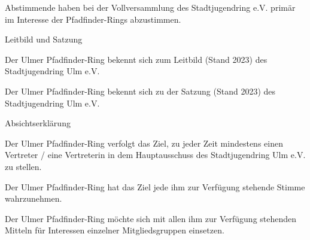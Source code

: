 \begin{legal}
\begin{legal}
\begin{legal}
                    \item Abstimmende haben bei der Vollversammlung des Stadtjugendring e.V. primär 
                          im Interesse der Pfadfinder-Rings abzustimmen.
                \end{legal}
            \item Leitbild und Satzung
                \begin{legal}
                    \item Der Ulmer Pfadfinder-Ring bekennt sich zum Leitbild (Stand 2023) des 
                          Stadtjugendring Ulm e.V.
                    \item Der Ulmer Pfadfinder-Ring bekennt sich zu der Satzung (Stand 2023) des 
                          Stadtjugendring Ulm e.V.
                \end{legal}
        \end{legal}
    \item Absichtserklärung
        \begin{legal}
            \item Der Ulmer Pfadfinder-Ring verfolgt das Ziel, zu jeder Zeit mindestens einen 
                  Vertreter / eine Vertreterin in dem Hauptausschuss des Stadtjugendring Ulm e.V. 
                  zu stellen.
            \item Der Ulmer Pfadfinder-Ring hat das Ziel jede ihm zur Verfügung stehende Stimme 
                  wahrzunehmen.
            \item Der Ulmer Pfadfinder-Ring möchte sich mit allen ihm zur Verfügung stehenden 
                  Mitteln für Interessen einzelner Mitgliedsgruppen einsetzen.
        \end{legal}
\end{legal}
